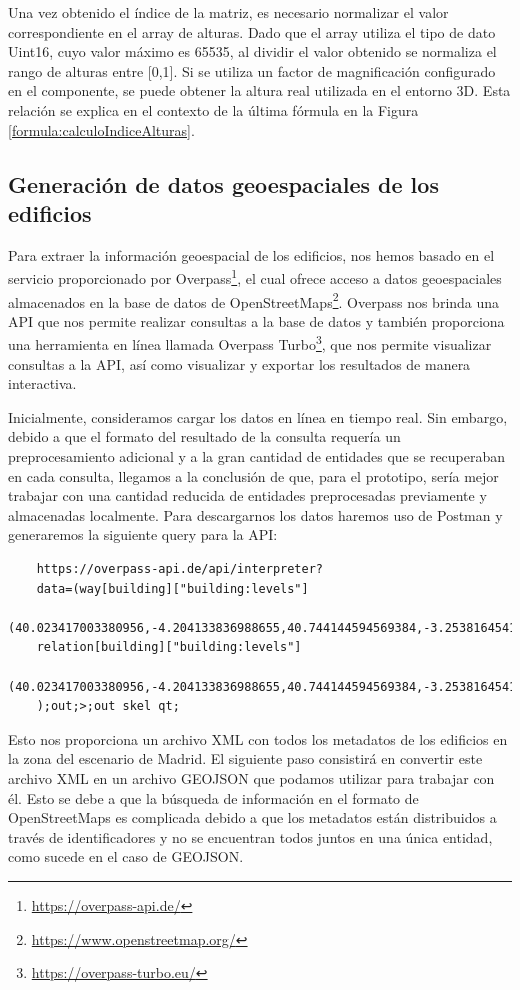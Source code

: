 \documentclass[a4paper, 11pt]{book}
\begin{document}
Una vez obtenido el índice de la matriz, es necesario normalizar el valor correspondiente en el array de alturas. Dado que el array utiliza el tipo de dato Uint16, cuyo valor máximo es 65535, al dividir el valor obtenido se normaliza el rango de alturas entre [0,1]. Si se utiliza un factor de magnificación configurado en el componente, se puede obtener la altura real utilizada en el entorno 3D. Esta relación se explica en el contexto de la última fórmula en la Figura \ref{formula:calculoIndiceAlturas}.

\subsection{Generación de datos geoespaciales de los edificios}
\label{subsec:buildingData}
Para extraer la información geoespacial de los edificios, nos hemos basado en el servicio proporcionado por Overpass\footnote{\url{https://overpass-api.de/}}, el cual ofrece acceso a datos geoespaciales almacenados en la base de datos de OpenStreetMaps\footnote{\url{https://www.openstreetmap.org/}}. Overpass nos brinda una API que nos permite realizar consultas a la base de datos y también proporciona una herramienta en línea llamada Overpass Turbo\footnote{\url{https://overpass-turbo.eu/}}, que nos permite visualizar consultas a la API, así como visualizar y exportar los resultados de manera interactiva.

Inicialmente, consideramos cargar los datos en línea en tiempo real. Sin embargo, debido a que el formato del resultado de la consulta requería un preprocesamiento adicional y a la gran cantidad de entidades que se recuperaban en cada consulta, llegamos a la conclusión de que, para el prototipo, sería mejor trabajar con una cantidad reducida de entidades preprocesadas previamente y almacenadas localmente.
Para descargarnos los datos haremos uso de Postman y generaremos la siguiente query para la API:
 \label{manual:consultaEdificios}
{\scriptsize
    \begin{verbatim}
    https://overpass-api.de/api/interpreter?
    data=(way[building]["building:levels"]
    (40.023417003380956,-4.204133836988655,40.744144594569384,-3.253816454176155);
    relation[building]["building:levels"]
    (40.023417003380956,-4.204133836988655,40.744144594569384,-3.253816454176155);
    );out;>;out skel qt;
    \end{verbatim}
}
Esto nos proporciona un archivo XML con todos los metadatos de los edificios en la zona del escenario de Madrid. El siguiente paso consistirá en convertir este archivo XML en un archivo GEOJSON que podamos utilizar para trabajar con él. Esto se debe a que la búsqueda de información en el formato de OpenStreetMaps es complicada debido a que los metadatos están distribuidos a través de identificadores y no se encuentran todos juntos en una única entidad, como sucede en el caso de GEOJSON.
\end{document}
